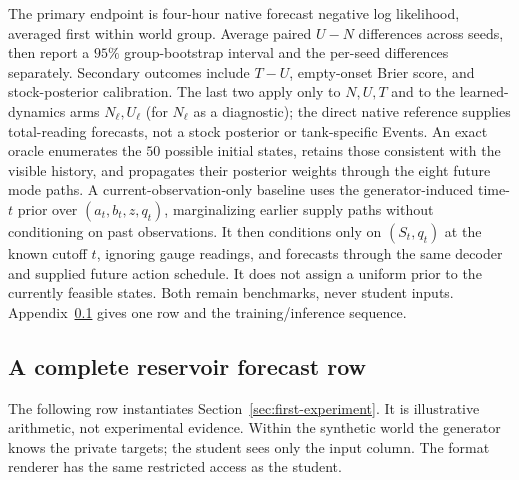 \documentclass[10pt]{article}
\begin{document}
The primary endpoint is four-hour native forecast negative log likelihood,
averaged first within world group. Average paired $U-N$ differences across
seeds, then report a $95\%$ group-bootstrap interval and the per-seed
differences separately. Secondary outcomes include $T-U$, empty-onset Brier
score, and stock-posterior calibration. The last two apply only to $N,U,T$ and to the learned-dynamics arms
$N_\ell,U_\ell$ (for $N_\ell$ as a diagnostic);
the direct native reference supplies total-reading forecasts, not a stock
posterior or tank-specific Events.
An exact oracle enumerates the $50$ possible initial states, retains those
consistent with the visible history, and propagates their posterior weights
through the eight future mode paths. A current-observation-only baseline uses
the generator-induced time-$t$ prior over $(a_t,b_t,z,q_t)$, marginalizing
earlier supply paths without conditioning on past observations. It then
conditions only on $(S_t,q_t)$ at the known cutoff $t$, ignoring gauge readings,
and forecasts through the same decoder and supplied future action schedule.
It does not assign a uniform prior to the currently feasible states. Both
remain benchmarks, never student inputs. Appendix~\ref{app:reservoir-row} gives
one row and the training/inference sequence.

\subsection{A complete reservoir forecast row}
\label{app:reservoir-row}

The following row instantiates Section~\ref{sec:first-experiment}. It is
illustrative arithmetic, not experimental evidence. Within the synthetic
world the generator knows the private targets; the student sees only the
input column. The format renderer has the same restricted access as the
student.
\end{document}

